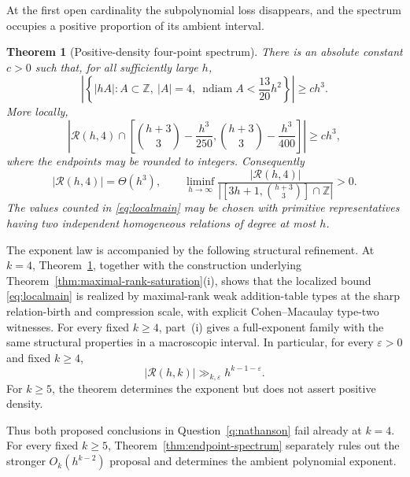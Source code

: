 \documentclass[11pt,reqno]{amsart}
\newtheorem{theorem}{Theorem}[section]
\theoremstyle{definition}
\theoremstyle{remark}
\newcommand{\Z}{\mathbb Z}
\newcommand{\Rcal}{\mathcal R}
\newcommand{\ndiam}{\operatorname{ndiam}}
\begin{document}
At the first open cardinality the subpolynomial loss disappears, and the
spectrum occupies a positive proportion of its ambient interval.

\begin{theorem}[Positive-density four-point spectrum]\label{thm:main}
There is an absolute constant $c>0$ such that, for all sufficiently large
$h$,
\begin{equation}\label{eq:quantmain}
 \left|\left\{|hA|:A\subset\Z,\ |A|=4,
 \ \ndiam A<\frac{13}{20}h^2\right\}\right|\geq ch^3.
\end{equation}
More locally,
\begin{equation}\label{eq:localmain}
 \left|\Rcal(h,4)\cap
 \left[\binom{h+3}{3}-\frac{h^3}{250},
       \binom{h+3}{3}-\frac{h^3}{400}\right]\right|\geq ch^3,
\end{equation}
where the endpoints may be rounded to integers.  Consequently
\[
 \boxed{|\Rcal(h,4)|=\Theta(h^3)},
 \qquad
 \liminf_{h\to\infty}
 \frac{|\Rcal(h,4)|}{|[3h+1,\binom{h+3}{3}]\cap\Z|}>0.
\]
The values counted in \eqref{eq:localmain} may be chosen with primitive
representatives having two independent homogeneous relations of degree at
most $h$.
\end{theorem}

The exponent law is accompanied by the following structural refinement.  At $k=4$,
Theorem~\ref{thm:main}, together with the construction underlying
Theorem~\ref{thm:maximal-rank-saturation}\textup{(i)}, shows that the
localized bound \eqref{eq:localmain} is realized by maximal-rank weak
addition-table types at the sharp relation-birth and compression scale, with
explicit Cohen--Macaulay type-two witnesses.  For every fixed $k\geq4$,
part~\textup{(i)} gives a full-exponent family with the same structural
properties in a macroscopic interval.  In particular, for every
$\varepsilon>0$ and fixed $k\geq4$,
\begin{equation}\label{eq:endpoint-epsilon-form}
 |\Rcal(h,k)|\gg_{k,\varepsilon}h^{k-1-\varepsilon}.
\end{equation}
For $k\geq5$, the theorem determines the exponent but does not assert
positive density.

Thus both proposed conclusions in Question~\ref{q:nathanson} fail already
at $k=4$.  For every fixed $k\geq5$, Theorem~\ref{thm:endpoint-spectrum}
separately rules out the stronger $O_k(h^{k-2})$ proposal and determines the
ambient polynomial exponent.
\end{document}
